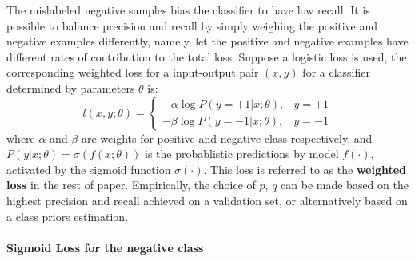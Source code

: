 The mislabeled negative samples bias the classifier to have low recall.
It is possible to balance precision and recall by simply weighing the positive and negative examples differently, namely, let the positive and negative examples have different rates of contribution to the total loss.
Suppose a logistic loss is used, the corresponding weighted loss for a input-output pair $(x, y)$ for a classifier determined by parameters $\theta$ is:
\[
  l(x, y; \theta) =
    \begin{cases}
      - \alpha \log P(y=+1 \vert x; \theta), & y = +1 \\
      - \beta \log P(y=-1 \vert x; \theta), & y = -1
    \end{cases}
\]
where $\alpha$ and $\beta$ are weights for positive and negative class respectively, and $P(y\vert x; \theta)=\sigma(f(x; \theta))$ is the probablistic predictions by model $f(\cdot)$, activated by the sigmoid function $\sigma(\cdot)$.
This loss is referred to as the \textbf{weighted loss} in the rest of paper.
Empirically, the choice of $p$, $q$ can be made based on the highest precision and recall achieved on a validation set, or alternatively based on a class priors estimation\cite{du2014class}.



\paragraph{Sigmoid Loss for the negative class}

